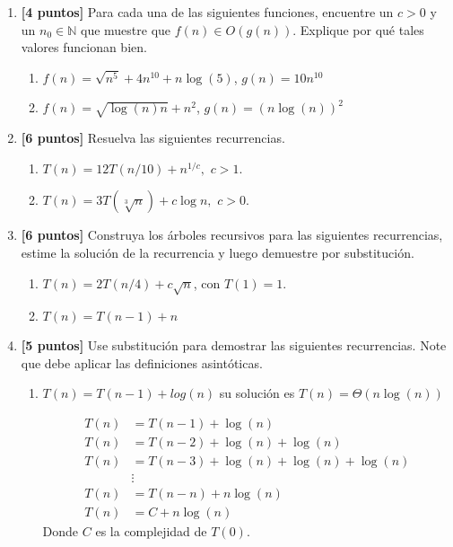 \documentclass[10pt]{article}
\newcommand{\N}{\mathbb{N}}
\newcommand{\Ot}[1]{O\left(#1\right)}
\begin{document}
\begin{enumerate}
\item \textbf{[4 puntos]}  Para cada una de las siguientes funciones, encuentre un $c>0$ y un $n_0\in\N$ que muestre que $f(n) \in \Ot{g(n)}$. Explique por qué tales valores funcionan bien.

\begin{enumerate}
  \item $f(n) = \sqrt{n^5}+4n^{10}+n\log(5) $, $g(n) = 10n^{10}$
  \item $f(n) = \sqrt{\log(n)n}+n^2$, $g(n) = (n\log(n))^2$
\end{enumerate} 


\item \textbf{[6 puntos]}  Resuelva las siguientes recurrencias.
\begin{enumerate}
  \item $T(n) = 12T\left(n/10\right) + n^{1/c},$ $c>1$.
  \item $T(n) = 3T\left(\sqrt[3]{n}\right) + c\log n,$ $c>0$.
\end{enumerate}

\item \textbf{[6 puntos]} Construya los árboles recursivos para las siguientes recurrencias, estime la solución de la recurrencia y luego demuestre por substitución.

\begin{enumerate}
  \item $T(n) = 2T(n/4) + c\sqrt{n}$, con $T(1) = 1$.
  \item $T(n) = T(n-1) + n$
\end{enumerate}

\item \textbf{[5 puntos]} Use substitución para demostrar las siguientes recurrencias. Note que debe aplicar las definiciones asintóticas. 

\begin{enumerate}
  \item $T(n) = T(n-1) + log(n)$ su solución es $T(n) = \Theta(n\log(n))$

	\begin{align*}
		T(n) &= T(n - 1) + \log(n)											\\
		T(n) &= T(n - 2) + \log(n) + \log(n)						\\
		T(n) &= T(n - 3) + \log(n) + \log(n) + \log(n)	\\
		     &  \vdots																\\
		T(n) &= T(n - n) + n\log(n)										\\
		T(n) &= C + n \log(n)
	\end{align*}
	Donde $C$ es la complejidad de $T(0)$.


\end{enumerate}
\end{enumerate}
\end{document}
